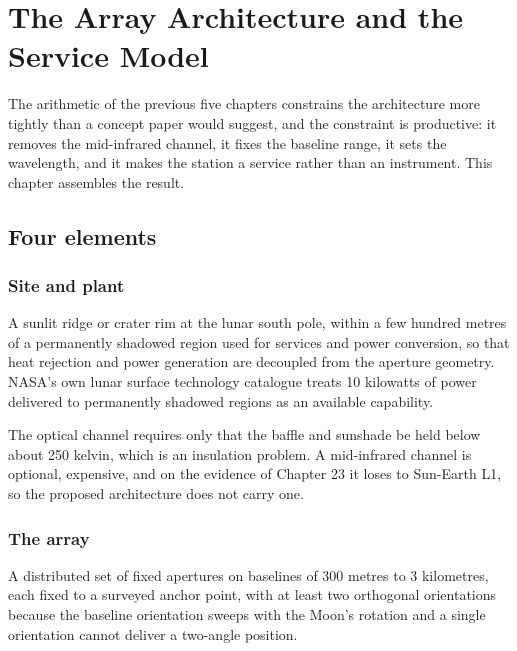
\chapter{The Array Architecture and the Service Model}
\label{ch:architecture}

The arithmetic of the previous five chapters constrains the architecture
more tightly than a concept paper would suggest, and the constraint is
productive: it removes the mid-infrared channel, it fixes the baseline
range, it sets the wavelength, and it makes the station a service rather
than an instrument. This chapter assembles the result.

\section{Four elements}

\subsection{Site and plant}

A sunlit ridge or crater rim at the lunar south pole, within a few hundred
metres of a permanently shadowed region used for services and power
conversion, so that heat rejection and power generation are decoupled from
the aperture geometry. NASA's own lunar surface technology catalogue treats
10 kilowatts of power delivered to permanently shadowed regions as an
available capability.

The optical channel requires only that the baffle and sunshade be held
below about 250 kelvin, which is an insulation problem. A mid-infrared
channel is optional, expensive, and on the evidence of Chapter 23 it loses to
Sun-Earth L1, so the proposed architecture does not carry one.

\subsection{The array}

A distributed set of fixed apertures on baselines of 300 metres to
3 kilometres, each fixed to a surveyed anchor point, with at least two
orthogonal orientations because the baseline orientation sweeps with the
Moon's rotation and a single orientation cannot deliver a two-angle
position.

